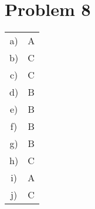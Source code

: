 \documentclass{article}
\begin{document}
\section*{Problem 8}
\begin{tabular}{ c c }
    a)  &A\\
    b)  &C\\
    c)  &C\\
    d)  &B\\
    e)  &B\\
    f)  &B\\
    g)  &B\\
    h)  &C\\
    i)  &A\\
    j)  &C
\end{tabular}
\end{document}
